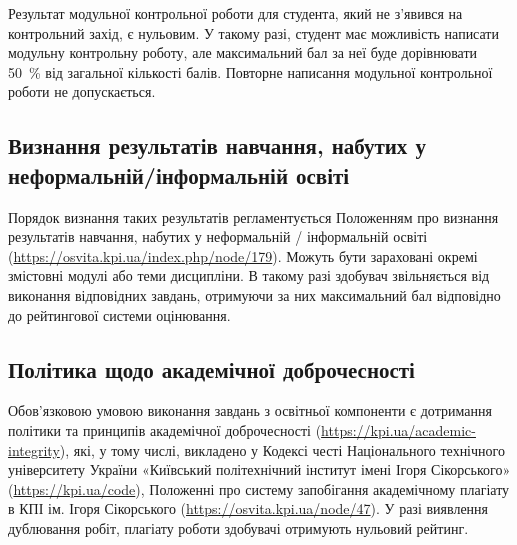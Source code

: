 \documentclass{Syllabus}
\begin{document}
Результат модульної контрольної роботи для студента, який не з’явився на контрольний захід, є нульовим. У такому разі, студент має можливість написати модульну контрольну роботу, але максимальний бал за неї буде дорівнювати 50~\% від загальної кількості балів. Повторне написання модульної контрольної роботи не допускається.


\subsection*{Визнання  результатів  навчання,  набутих  у  неформальній/інформальній освіті}

Порядок визнання таких результатів регламентується Положенням про визнання результатів навчання, набутих у неформальній / інформальній освіті (\url{https://osvita.kpi.ua/index.php/node/179}).  Можуть бути зараховані окремі змістовні модулі або теми дисципліни. В такому разі здобувач звільняється від виконання відповідних завдань, отримуючи за них максимальний бал відповідно до рейтингової системи оцінювання.


\subsection*{Політика щодо академічної доброчесності}

Обов’язковою умовою виконання завдань з освітньої компоненти є дотримання політики та принципів академічної доброчесності (\url{https://kpi.ua/academic-integrity}), які, у тому числі, викладено у Кодексі честі Національного технічного університету України «Київський політехнічний інститут імені Ігоря Сікорського» (\url{https://kpi.ua/code}), Положенні про систему запобігання академічному плагіату в КПІ ім. Ігоря Сікорського (\url{https://osvita.kpi.ua/node/47}). У разі виявлення дублювання робіт, плагіату роботи здобувачі отримують нульовий рейтинг.
\end{document}

